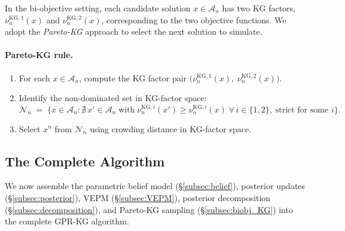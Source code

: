 \documentclass[12pt]{article}
\theoremstyle{plain}
\theoremstyle{definition}
\theoremstyle{remark}
\begin{document}
In the bi-objective setting, each candidate solution $x \in \mathcal{A}_n$ has two KG factors, $\nu^{\mathrm{KG},1}_n(x)$ and $\nu^{\mathrm{KG},2}_n(x)$, corresponding to the two objective functions. We adopt the \emph{Pareto-KG} approach to select the next solution to simulate.

\paragraph{Pareto-KG rule.}
\begin{enumerate}
  \item For each $x \in \mathcal{A}_n$, compute the KG factor pair $\bigl(\nu^{\mathrm{KG},1}_n(x),\; \nu^{\mathrm{KG},2}_n(x)\bigr)$.
  \item Identify the non-dominated set in KG-factor space:
  \begin{equation}\label{eq:KG_nondominated}
    \mathcal{N}_n \;=\; \bigl\{x \in \mathcal{A}_n : \nexists\, x' \in \mathcal{A}_n \;\text{with}\; \nu^{\mathrm{KG},i}_n(x') \geq \nu^{\mathrm{KG},i}_n(x)\; \forall\, i \in \{1,2\},\; \text{strict for some } i\bigr\}.
  \end{equation}
  \item Select $x^n$ from $\mathcal{N}_n$ using crowding distance in KG-factor space.
\end{enumerate}


\subsection{The Complete Algorithm}\label{subsec:algorithm}

We now assemble the parametric belief model (\S\ref{subsec:belief}), posterior updates (\S\ref{subsec:posterior}), VEPM (\S\ref{subsec:VEPM}), posterior decomposition (\S\ref{subsec:decomposition}), and Pareto-KG sampling (\S\ref{subsec:biobj_KG}) into the complete GPR-KG algorithm.
\end{document}
